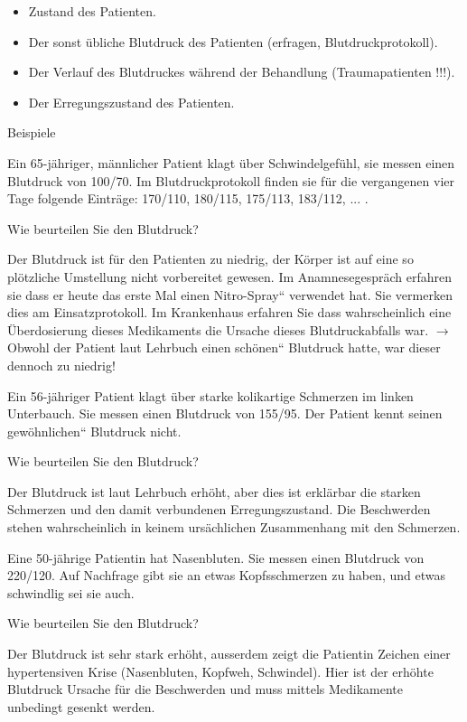 \documentclass{article}
\begin{document}
\begin{itemize}
\item Zustand des Patienten.

\item Der sonst \"ubliche Blutdruck des Patienten (erfragen,
Blutdruckprotokoll).

\item Der Verlauf des Blutdruckes w\"ahrend der Behandlung
(Traumapatienten !!!).

\item Der Erregungszustand des Patienten.

\end{itemize}
Beispiele

Ein 65-j\"ahriger, m\"annlicher Patient klagt \"uber Schwindelgef\"uhl,
sie messen einen Blutdruck von 100/70. Im Blutdruckprotokoll finden sie
f\"ur die vergangenen vier Tage folgende Eintr\"age: 170/110, 180/115,
175/113, 183/112, ... .

Wie beurteilen Sie den Blutdruck? 

Der Blutdruck ist f\"ur den Patienten zu niedrig, der K\"orper ist auf
eine so pl\"otzliche Umstellung nicht vorbereitet gewesen. Im
Anamnesegespr\"ach erfahren sie dass er heute das erste Mal einen
{\quotedblbase}Nitro-Spray{\textquotedblleft} verwendet hat. Sie
vermerken dies am Einsatzprotokoll. Im Krankenhaus erfahren Sie dass
wahrscheinlich eine \"Uberdosierung dieses Medikaments die Ursache
dieses Blutdruckabfalls war. ${\rightarrow}$ Obwohl der Patient laut
Lehrbuch einen {\quotedblbase}sch\"onen{\textquotedblleft} Blutdruck
hatte, war dieser dennoch zu niedrig!

Ein 56-j\"ahriger Patient klagt \"uber starke kolikartige Schmerzen im
linken Unterbauch. Sie messen einen Blutdruck von 155/95. Der Patient
kennt seinen {\quotedblbase}gew\"ohnlichen{\textquotedblleft} Blutdruck
nicht.  

Wie beurteilen Sie den Blutdruck? 

Der Blutdruck ist laut Lehrbuch erh\"oht, aber dies ist erkl\"arbar die
starken Schmerzen und den damit verbundenen Erregungszustand. Die
Beschwerden stehen wahrscheinlich in keinem urs\"achlichen Zusammenhang
mit den Schmerzen. 

Eine 50-j\"ahrige Patientin hat Nasenbluten. Sie messen einen Blutdruck
von 220/120. Auf Nachfrage gibt sie an etwas Kopfsschmerzen zu haben,
und etwas schwindlig sei sie auch. 

Wie beurteilen Sie den Blutdruck? 

Der Blutdruck ist sehr stark erh\"oht, ausserdem zeigt die Patientin
Zeichen einer hypertensiven Krise (Nasenbluten, Kopfweh, Schwindel).
Hier ist der erh\"ohte Blutdruck Ursache f\"ur die Beschwerden und muss
mittels Medikamente unbedingt gesenkt werden. 
\end{document}
